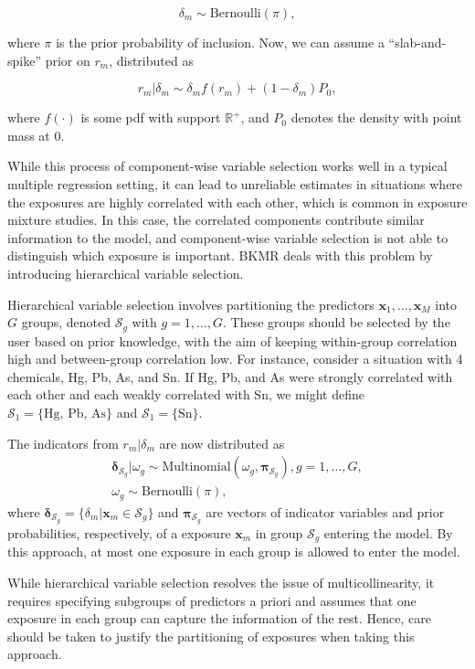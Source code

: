 \documentclass[12pt, twoside]{amherstthesis}
\begin{document}
\[
\delta_m \sim \text{Bernoulli}(\pi),
\]

\noindent where \(\pi\) is the prior probability of inclusion. Now, we can assume a ``slab-and-spike'' prior on \(r_m\), distributed as

\[
r_m|\delta_m \sim \delta_mf(r_m) + (1-\delta_m)P_0,
\]

\noindent where \(f(\cdot)\) is some pdf with support \(\mathbb{R}^+\), and \(P_0\) denotes the density with point mass at 0.

While this process of component-wise variable selection works well in a typical multiple regression setting, it can lead to unreliable estimates in situations where the exposures are highly correlated with each other, which is common in exposure mixture studies. In this case, the correlated components contribute similar information to the model, and component-wise variable selection is not able to distinguish which exposure is important. BKMR deals with this problem by introducing hierarchical variable selection.

Hierarchical variable selection involves partitioning the predictors \(\textbf{x}_1, \dots, \textbf{x}_M\) into \(G\) groups, denoted \(\mathcal{S}_g\) with \(g = 1,\dots,G\). These groups should be selected by the user based on prior knowledge, with the aim of keeping within-group correlation high and between-group correlation low. For instance, consider a situation with 4 chemicals, Hg, Pb, As, and Sn. If Hg, Pb, and As were strongly correlated with each other and each weakly correlated with Sn, we might define \(\mathcal{S}_1=\{\textrm{Hg, Pb, As}\}\) and \(\mathcal{S}_1=\{\textrm{Sn}\}\).

The indicators from \(r_m|\delta_m\) are now distributed as
\begin{gather*}
\boldsymbol\delta_{\mathcal{S}_g} | \omega_g \sim 
\text{Multinomial}(\omega_g, \boldsymbol\pi_{\mathcal{S}_g}), g=1,\dots,G,\\
\omega_g \sim\text{Bernoulli}(\pi),
\end{gather*}
\noindent where \(\boldsymbol\delta_{\mathcal{S}_g}=\{\delta_m|\textbf{x}_m \in{\mathcal{S}_g}\}\) and \(\boldsymbol\pi_{\mathcal{S}_g}\) are vectors of indicator variables and prior probabilities, respectively, of a exposure \(\textbf{x}_m\) in group \(\mathcal{S}_g\) entering the model. By this approach, at most one exposure in each group is allowed to enter the model.

While hierarchical variable selection resolves the issue of multicollinearity, it requires specifying subgroups of predictors a priori and assumes that one exposure in each group can capture the information of the rest. Hence, care should be taken to justify the partitioning of exposures when taking this approach.
\end{document}
